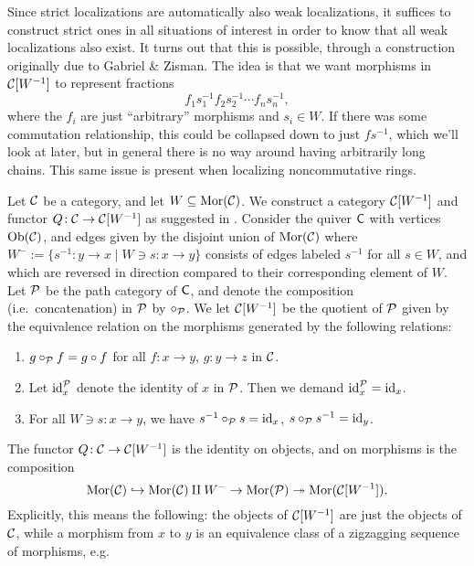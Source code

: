 Since strict localizations are automatically also weak localizations, it suffices to construct strict ones in all situations of interest in order to know that all weak localizations
also exist. It turns out that this is possible, through a construction originally due to Gabriel \& Zisman. The idea is that we want morphisms in \(\mathcal{C}[W^{-1}]\) to represent
fractions
\[ f_1s_1^{-1}f_2s_2^{-1}\cdots f_ns_n^{-1}, \]
where the \(f_i\) are just ``arbitrary'' morphisms and \(s_i\in W\). If there was some commutation relationship, this could be collapsed down to just \(fs^{-1}\), which we'll look
at later, but in general there is no way around having arbitrarily long chains. This same issue is present when localizing noncommutative rings.
\begin{construction}\label{construction:gabriel-zisman-localization}
	Let \(\mathcal{C}\) be a category, and let \(W\subseteq\operatorname{Mor}(\mathcal{C})\). We construct a category \(\mathcal{C}[W^{-1}]\) and functor \(Q\!:\mathcal{C}\to\mathcal{C}[W^{-1}]\) as suggested in \cite{krause-homological-theory-of-representations}.
	Consider the quiver \(\mathsf{C}\) with vertices \(\operatorname{Ob}(\mathcal{C})\), and edges given by the disjoint union of \(\operatorname{Mor}(\mathcal{C})\) where \(W^- := \{ s^{-1}\!: y\to x \mid W\ni s\!:x\to y \}\) consists
	of edges labeled \(s^{-1}\) for all \(s\in W\), and which are reversed in direction compared to their corresponding element of \(W\). Let \(\mathcal{P}\) be the path category of \(\mathsf{C}\), and
	denote the composition (i.e.\ concatenation) in \(\mathcal{P}\) by \(\circ_{\mathcal{P}}\). We let \(\mathcal{C}[W^{-1}]\) be the quotient of \(\mathcal{P}\) given by the equivalence relation on the morphisms generated by
	the following relations:
	\begin{enumerate}[label=(\arabic*)]
	\item \(g\circ_{\mathcal{P}} f = g\circ f\) for all \(f\!:x\to y\), \(g\!:y\to z\) in \(\mathcal{C}\).
	\item Let \(\mathrm{id}^{\mathcal{P}}_x\) denote the identity of \(x\) in \(\mathcal{P}\). Then we demand \(\mathrm{id}^{\mathcal{P}}_x = \mathrm{id}_x\).
	\item For all \(W\ni s\!:x\to y\), we have \(s^{-1}\circ_{\mathcal{P}} s = \mathrm{id}_x\), \(s\circ_{\mathcal{P}} s^{-1} = \mathrm{id}_y\).
	\end{enumerate}
	The functor \(Q\!:\mathcal{C}\to\mathcal{C}[W^{-1}]\) is the identity on objects, and on morphisms is the composition
	\[ \operatorname{Mor}(\mathcal{C})\hookrightarrow \operatorname{Mor}(\mathcal{C})\amalg W^- \to \operatorname{Mor}(\mathcal{P}) \twoheadrightarrow \operatorname{Mor}(\mathcal{C}[W^{-1}]). \]
	Explicitly, this means the following: the objects of \(\mathcal{C}[W^{-1}]\) are just the objects of \(\mathcal{C}\), while a morphism from \(x\) to \(y\) is an equivalence class of a zigzagging sequence of morphisms, e.g.

\end{construction}
